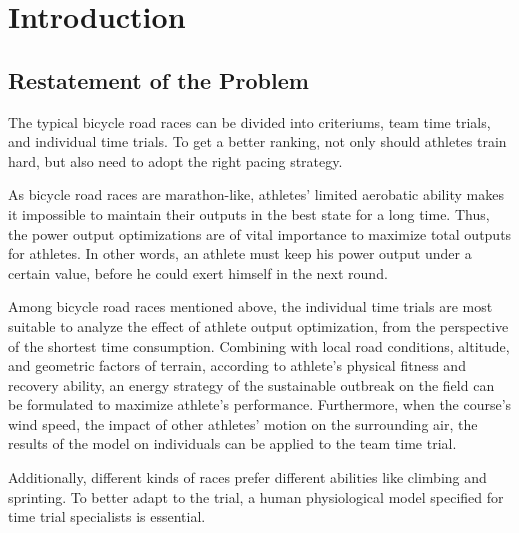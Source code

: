 \documentclass{mcmthesis}
\begin{document}
 \maketitle


\tableofcontents
\newpage
\section{Introduction}
\subsection{Restatement of the Problem}
The typical bicycle road races can be divided into criteriums, team time trials, and individual time trials. To get a better ranking, not only should athletes train hard, but also need to adopt the right pacing strategy. 
\par 
As bicycle road races are marathon-like, athletes' limited aerobatic ability makes it impossible to maintain their outputs in the best state for a long time. Thus, the power output optimizations are of vital importance to maximize total outputs for athletes. In other words, an athlete must keep his power output under a certain value, before he could exert himself in the next round.  
\par  
Among bicycle road races mentioned above, the individual time trials are most suitable to analyze the effect of athlete output optimization, from the perspective of the shortest time consumption. Combining with local road conditions, altitude, and geometric factors of terrain, according to athlete's physical fitness and recovery ability, an energy strategy of the sustainable outbreak on the field can be formulated to maximize athlete's performance. Furthermore, when the course's wind speed, the impact of other athletes' motion on the surrounding air, the results of the model on individuals can be applied to the team time trial.
\par 
Additionally, different kinds of races prefer different abilities like climbing and sprinting. To better adapt to the trial, a human physiological model specified for time trial specialists is essential.
\end{document}
